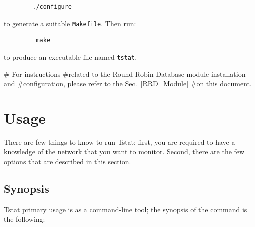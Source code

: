\documentclass[11pt]{article}
\begin{document}
\begin{small}\begin{verbatim}
        ./configure
\end{verbatim}\end{small} \noindent
to generate a suitable \texttt{Makefile}. Then run:

\begin{small}\begin{verbatim}
         make
\end{verbatim}\end{small} \noindent
to produce an executable file named \texttt{tstat}.



\# For instructions
\#related to the Round Robin Database module installation and
\#configuration, please refer to the Sec.~\ref{RRD_Module}
\#on this document.

\section{Usage\label{Usage}}


There are few things to know to run Tstat: first, you are required to have a
knowledge  of the network that you want to monitor. 
Second, there are the few options that are described in this section.

\subsection{Synopsis\label{Synopsis}}


Tstat primary usage is as a command-line tool; the synopsis of 
the command is the following:
\end{document}
